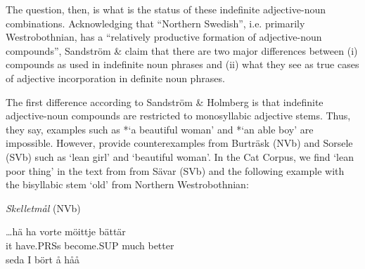 
The question, then, is what is the status of these indefinite adjective-noun combinations. Acknowledging that “Northern Swedish”, i.e. primarily Westrobothnian, has a “relatively productive formation of adjective-noun compounds”, Sandström \& \citet[91]{Holmberg2003} claim that there are two major differences between (i) compounds as used in indefinite noun phrases and (ii) what they see as true cases of adjective incorporation in definite noun phrases.


The first difference according to Sandström \& Holmberg is that indefinite adjective-noun compounds are restricted to monosyllabic adjective stems. Thus, they say, examples such as *‘a beautiful woman’ and *‘an able boy’ are impossible. However, \citet[47]{BergholmEtAl1999} provide counterexamples from Burträsk (NVb) and Sorsele (SVb) such as  ‘lean girl’ and  ‘beautiful woman’. In the Cat Corpus, we find  ‘lean poor thing’ in the text from from Sävar (SVb) and the following example with the bisyllabic stem  ‘old’ from Northern Westrobothnian:


\item 

\textit{Skelletmål} (NVb)



 \ea\label{}
\gll …hä  ha  vorte  möittje  bättär\\


it  have.PRSs  become.SUP  much  better\\

 \ea\label{}
\gll seda  I  bört  å  håå\\


